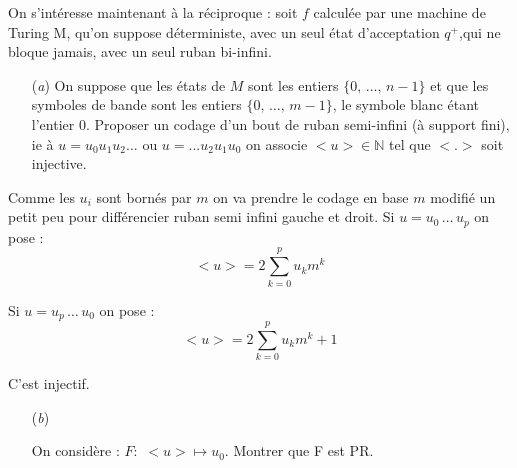 \documentclass[12pt,letterpaper,boxed]{hmcpset}
\begin{document}
\begin{problem}[Question 6]
On s’intéresse maintenant à la réciproque : soit $f$ calculée par une machine de Turing
M, qu’on suppose déterministe, avec un seul état d’acceptation $q^{+}$,qui ne bloque
jamais, avec un seul ruban bi-infini.


\begin{itemize}
  \item[(\textit{a})] On suppose que les états de $M$ sont les entiers $\{0, \, \dots , \, n-1\}$ et que les symboles de bande sont les entiers $\{0, \, \dots , \, m-1\}$, le symbole blanc étant l'entier $0$. Proposer un codage d’un bout de ruban semi-infini (à support fini), ie à $u = u_{0}u_{1}u_{2} . . .$ ou $u =
. . . u_{2}u_{1}u_{0}$ on associe $<u> \in \mathbb{N}$ tel que $< . >$ soit injective.
  
   \end{itemize}
\end{problem}

\begin{solution}[a)]
Comme les $u_{i}$ sont bornés par $m$ on va prendre le codage en base $m$ modifié un petit peu pour différencier ruban semi infini gauche et droit. Si $u = u_{0} \, \dots \, u_{p}$ on pose :
$$ <u> = 2\sum_{k=0}^{p} u_{k} m^{k}$$

Si $u = u_{p} \, \dots \, u_{0}$ on pose : 
$$ <u> = 2\sum_{k=0}^{p} u_{k} m^{k}+1$$

\noindent C'est injectif.

\end{solution}

\begin{problem}
\begin{itemize}
  \item[(\textit{b})] 
  
  On considère : $F : \, \, <u> \mapsto u_{0}$. Montrer que F est PR.
    
   \end{itemize}
\end{problem}
\end{document}
